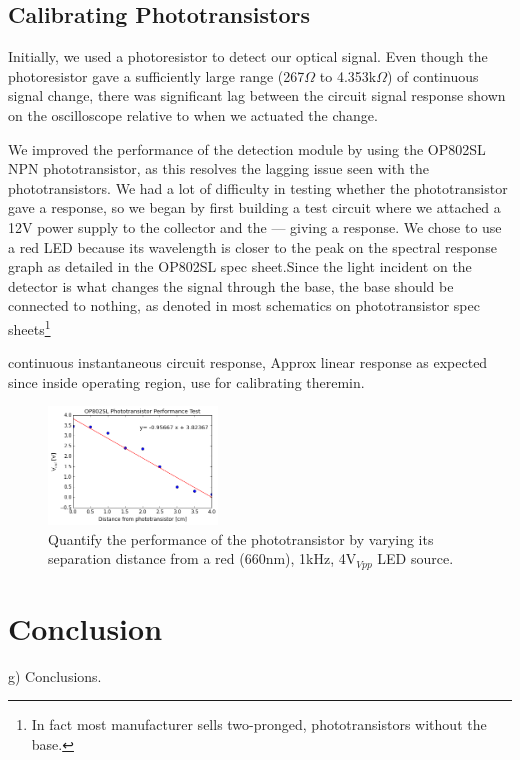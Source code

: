 \documentclass[twocolumn]{article}
\begin{document}
\subsection{Calibrating Phototransistors}
\par Initially, we used a photoresistor to detect our optical signal. Even though the photoresistor gave a sufficiently large range (267$\Omega$ to 4.353k$\Omega$) of continuous signal change, there was significant lag between the circuit signal response shown on the oscilloscope relative to when we actuated the change. 
\par We improved the performance of the detection module by using the OP802SL NPN phototransistor, as this resolves the lagging issue seen with the phototransistors. We had a lot of difficulty in testing whether the phototransistor gave a response, so we began by first building a test circuit where we attached a 12V power supply to the collector and the --- giving a response.  We chose to use a red LED because its wavelength is closer to the peak on the spectral response graph as detailed in the OP802SL spec sheet.Since the light incident on the detector is what changes the signal through the base, the base should be connected to nothing, as denoted in most schematics on phototransistor spec sheets\footnote{In fact most manufacturer sells two-pronged, phototransistors without the base.}
\par  continuous instantaneous circuit response,
Approx linear response as expected since inside operating region, use for calibrating theremin. 
\begin{figure}[h!]
 \centering
 \includegraphics[width=0.4\textwidth]{figure/phototransistor_performance}
\caption{Quantify the performance of the phototransistor by varying its separation distance from a red (660nm), 1kHz, 4V$_{Vpp}$ LED source.}
\label{phototransistor_performance}
\end{figure}
\section{Conclusion}
g)              Conclusions.
\end{document}
